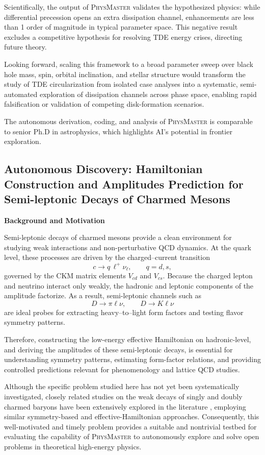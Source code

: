 \documentclass[11pt, a4paper, logo, copyright, nonumbering]{SAI}
\newcommand{\agent}{\textsc{PhysMaster}\xspace}
\begin{document}
Scientifically, the output of \agent validates the hypothesized physics: while differential precession opens an extra dissipation channel, enhancements are less than 1 order of magnitude in typical parameter space. This negative result excludes a competitive hypothesis for resolving TDE energy crises, directing future theory. 

Looking forward, scaling this framework to a broad parameter sweep over black hole mass, spin, orbital inclination, and stellar structure would transform the study of TDE circularization from isolated case analyses into a systematic, semi-automated exploration of dissipation channels across phase space, enabling rapid falsification or validation of competing disk-formation scenarios.

The autonomous derivation, coding, and analysis of \agent is comparable to senior Ph.D in astrophysics, which highlights AI's potential in frontier exploration.

\subsection{Autonomous Discovery: Hamiltonian Construction and Amplitudes Prediction for Semi-leptonic Decays of Charmed Mesons}

\noindent \textbf{Background and Motivation}

Semi-leptonic decays of charmed mesons provide a clean environment for studying weak interactions and non-perturbative QCD dynamics. At the quark level, these processes are driven by the charged--current transition
\[
c \rightarrow q\, \ell^+ \nu_\ell , \qquad q=d,s ,
\]
governed by the CKM matrix elements \(V_{cd}\) and \(V_{cs}\). Because the charged lepton and neutrino interact only weakly, the hadronic and leptonic components of the amplitude factorize. As a result, semi-leptonic channels such as
\[
D \to \pi \ell \nu, \qquad D \to K \ell \nu
\]
are ideal probes for extracting heavy--to--light form factors and testing flavor symmetry patterns.

Therefore, constructing the low-energy effective Hamiltonian on hadronic-level, and deriving the amplitudes of these semi-leptonic decays, is essential for understanding symmetry patterns, estimating form-factor relations, and providing controlled predictions relevant for phenomenology and lattice QCD studies.

Although the specific problem studied here has not yet been systematically investigated, closely related studies on the weak decays of singly and doubly charmed baryons have been extensively explored in the literature \cite{Lu:2016ogy,Wang:2017azm,Shi:2017dto}, employing similar symmetry-based and effective-Hamiltonian approaches. Consequently, this well-motivated and timely problem provides a suitable and nontrivial testbed for evaluating the capability of \agent to autonomously explore and solve open problems in theoretical high-energy physics.
\end{document}
